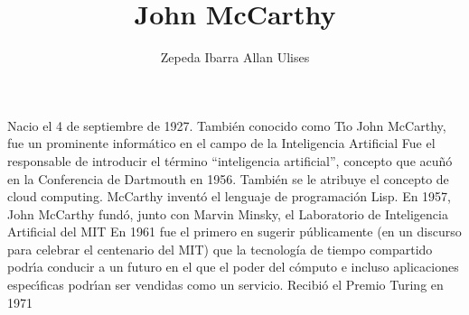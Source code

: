 \documentclass[a4paper,10pt]{article}
\title{John McCarthy}
\author{Zepeda Ibarra Allan Ulises}
\begin{document}
\maketitle


Nacio el 4 de septiembre de 1927. Tambi\'en conocido como T\'{\i}o John McCarthy, fue un prominente inform\'atico en el campo de la Inteligencia Artificial
Fue el responsable de introducir el t\'ermino “inteligencia artificial”, concepto que acu\~n\'o en la Conferencia de Dartmouth en 1956. 
Tambi\'en se le atribuye el concepto de cloud computing.
McCarthy invent\'o el lenguaje de programaci\'on Lisp. En 1957, John McCarthy fund\'o, junto con Marvin Minsky, el Laboratorio de Inteligencia Artificial del MIT
En 1961 fue el primero en sugerir p\'ublicamente (en un discurso para celebrar el centenario del MIT) que la tecnología de tiempo 
compartido podr\'{\i}a conducir a un futuro en el que el poder del c\'omputo e incluso aplicaciones espec\'{\i}ficas podr\'{\i}an ser vendidas como un 
servicio. Recibi\'o el Premio Turing en 1971
\end{document}
